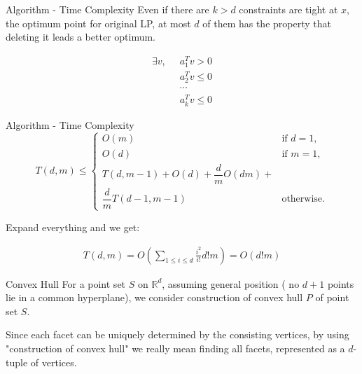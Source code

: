 \documentclass{beamer}
\begin{document}
\begin{frame}{Algorithm - Time Complexity}
	Even if there are $k > d$ constraints are tight at $x$, the optimum point for original LP, at most $d$ of them
	has the property that deleting it leads a better optimum.

	\vspace{\baselineskip}

	\begin{align*}
		\exists v, \;\; & a_1^Tv > 0   \\
		                & a_2^Tv \le 0 \\
		                & \cdots       \\
		                & a_k^Tv \le 0
	\end{align*}
\end{frame}
\begin{frame}{Algorithm - Time Complexity}
	\[
		T(d, m) \le
		\begin{cases}
			O(m)                         & \text{if } d = 1, \\
			O(d)                         & \text{if } m = 1, \\
			T(d, m - 1) + O(d) + \dfrac{d}{m} O(dm) +        \\
			\dfrac{d}{m} T(d - 1, m - 1) & \text{otherwise}.
		\end{cases}
	\]

	Expand everything and we get:

	\begin{align*}
		T(d, m) = O(\sum_{1\le i \le d} \frac{i^2}{i!} d! m) = O(d! m)
	\end{align*}

\end{frame}

\begin{frame}{Convex Hull}
	For a point set $S$ on $\mathbb{R}^d$, assuming general position ( no $d + 1$ points lie in a common hyperplane), we consider
	construction of convex hull $P$ of point set $S$.

	\vspace{\baselineskip}

	Since each facet can be uniquely determined by the consisting vertices,
	by using "construction of convex hull" we really mean finding all facets, represented as
	a $d$-tuple of vertices.
\end{frame}
\end{document}
